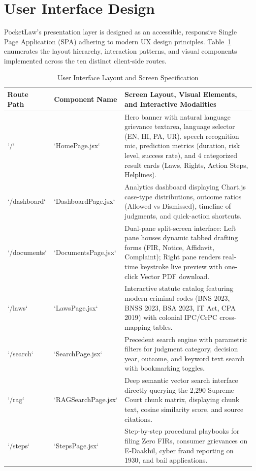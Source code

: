 \section{User Interface Design}
\label{sec:ui_design}

PocketLaw's presentation layer is designed as an accessible, responsive Single Page Application (SPA) adhering to modern UX design principles. Table~\ref{tab:ui_screens} enumerates the layout hierarchy, interaction patterns, and visual components implemented across the ten distinct client-side routes.

\begin{table}[H]
\caption{User Interface Layout and Screen Specification}
\label{tab:ui_screens}
\centering
\small
\begin{tabularx}{\textwidth}{lp{3.2cm}X}
\toprule
\textbf{Route Path} & \textbf{Component Name} & \textbf{Screen Layout, Visual Elements, and Interactive Modalities} \\
\midrule
`/` & `HomePage.jsx` & Hero banner with natural language grievance textarea, language selector (EN, HI, PA, UR), speech recognition mic, prediction metrics (duration, risk level, success rate), and 4 categorized result cards (Laws, Rights, Action Steps, Helplines). \\
\midrule
`/dashboard` & `DashboardPage.jsx` & Analytics dashboard displaying Chart.js case-type distributions, outcome ratios (Allowed vs Dismissed), timeline of judgments, and quick-action shortcuts. \\
\midrule
`/documents` & `DocumentsPage.jsx` & Dual-pane split-screen interface: Left pane houses dynamic tabbed drafting forms (FIR, Notice, Affidavit, Complaint); Right pane renders real-time keystroke live preview with one-click Vector PDF download. \\
\midrule
`/laws` & `LawsPage.jsx` & Interactive statute catalog featuring modern criminal codes (BNS 2023, BNSS 2023, BSA 2023, IT Act, CPA 2019) with colonial IPC/CrPC cross-mapping tables. \\
\midrule
`/search` & `SearchPage.jsx` & Precedent search engine with parametric filters for judgment category, decision year, outcome, and keyword text search with bookmarking toggles. \\
\midrule
`/rag` & `RAGSearchPage.jsx` & Deep semantic vector search interface directly querying the 2,290 Supreme Court chunk matrix, displaying chunk text, cosine similarity score, and source citations. \\
\midrule
`/steps` & `StepsPage.jsx` & Step-by-step procedural playbooks for filing Zero FIRs, consumer grievances on E-Daakhil, cyber fraud reporting on 1930, and bail applications. \\

\end{tabularx}
\end{table}
